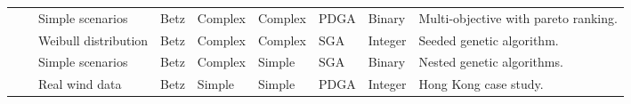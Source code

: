 \begin{sidewaystable}
\begin{center}
\begin{tabular}{l | l | l | l | l | l | l | l | l }
\cite{Sisbot}                  & \cite{Jensen}    & Simple scenarios      & Betz \citep{Albring}                & Complex     & Complex    & PDGA   & Binary   & Multi-objective with pareto ranking. \\
\cite{Saavedra-Morena} & \cite{Jensen}    & Weibull distribution  & Betz \citep{Albring}                & Complex     & Complex   & SGA    & Integer  & Seeded genetic algorithm. \\
\cite{Chen}                    & \cite{Frandsen} & Simple scenarios      & Betz \citep{Albring}                & Complex     & Simple       & SGA    & Binary   & Nested genetic algorithms. \\
\cite{Gao}                      & \cite{Jensen}    & Real wind data         & Betz \citep{Albring}                & Simple        & Simple       & PDGA   & Integer  & Hong Kong case study.
\end{tabular} 
\end{center}
\end{sidewaystable}
